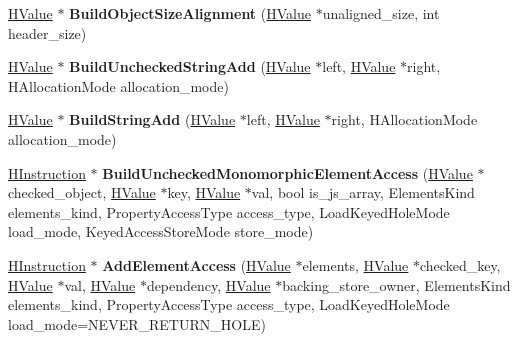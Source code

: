 \begin{DoxyCompactItemize}
\item 
\hyperlink{classv8_1_1internal_1_1_h_value}{H\+Value} $\ast$ {\bfseries Build\+Object\+Size\+Alignment} (\hyperlink{classv8_1_1internal_1_1_h_value}{H\+Value} $\ast$unaligned\+\_\+size, int header\+\_\+size)\hypertarget{classv8_1_1internal_1_1_h_graph_builder_af1a7dd376d381910a4a2dd7b678c6aa7}{}\label{classv8_1_1internal_1_1_h_graph_builder_af1a7dd376d381910a4a2dd7b678c6aa7}

\item 
\hyperlink{classv8_1_1internal_1_1_h_value}{H\+Value} $\ast$ {\bfseries Build\+Unchecked\+String\+Add} (\hyperlink{classv8_1_1internal_1_1_h_value}{H\+Value} $\ast$left, \hyperlink{classv8_1_1internal_1_1_h_value}{H\+Value} $\ast$right, H\+Allocation\+Mode allocation\+\_\+mode)\hypertarget{classv8_1_1internal_1_1_h_graph_builder_a9c72ba390fb67dd90f7692ae53a2450e}{}\label{classv8_1_1internal_1_1_h_graph_builder_a9c72ba390fb67dd90f7692ae53a2450e}

\item 
\hyperlink{classv8_1_1internal_1_1_h_value}{H\+Value} $\ast$ {\bfseries Build\+String\+Add} (\hyperlink{classv8_1_1internal_1_1_h_value}{H\+Value} $\ast$left, \hyperlink{classv8_1_1internal_1_1_h_value}{H\+Value} $\ast$right, H\+Allocation\+Mode allocation\+\_\+mode)\hypertarget{classv8_1_1internal_1_1_h_graph_builder_a26637e3f31db967d94388cf6a5f3299e}{}\label{classv8_1_1internal_1_1_h_graph_builder_a26637e3f31db967d94388cf6a5f3299e}

\item 
\hyperlink{classv8_1_1internal_1_1_h_instruction}{H\+Instruction} $\ast$ {\bfseries Build\+Unchecked\+Monomorphic\+Element\+Access} (\hyperlink{classv8_1_1internal_1_1_h_value}{H\+Value} $\ast$checked\+\_\+object, \hyperlink{classv8_1_1internal_1_1_h_value}{H\+Value} $\ast$key, \hyperlink{classv8_1_1internal_1_1_h_value}{H\+Value} $\ast$val, bool is\+\_\+js\+\_\+array, Elements\+Kind elements\+\_\+kind, Property\+Access\+Type access\+\_\+type, Load\+Keyed\+Hole\+Mode load\+\_\+mode, Keyed\+Access\+Store\+Mode store\+\_\+mode)\hypertarget{classv8_1_1internal_1_1_h_graph_builder_a31349bacb6b418d80b13464205bc1c77}{}\label{classv8_1_1internal_1_1_h_graph_builder_a31349bacb6b418d80b13464205bc1c77}

\item 
\hyperlink{classv8_1_1internal_1_1_h_instruction}{H\+Instruction} $\ast$ {\bfseries Add\+Element\+Access} (\hyperlink{classv8_1_1internal_1_1_h_value}{H\+Value} $\ast$elements, \hyperlink{classv8_1_1internal_1_1_h_value}{H\+Value} $\ast$checked\+\_\+key, \hyperlink{classv8_1_1internal_1_1_h_value}{H\+Value} $\ast$val, \hyperlink{classv8_1_1internal_1_1_h_value}{H\+Value} $\ast$dependency, \hyperlink{classv8_1_1internal_1_1_h_value}{H\+Value} $\ast$backing\+\_\+store\+\_\+owner, Elements\+Kind elements\+\_\+kind, Property\+Access\+Type access\+\_\+type, Load\+Keyed\+Hole\+Mode load\+\_\+mode=N\+E\+V\+E\+R\+\_\+\+R\+E\+T\+U\+R\+N\+\_\+\+H\+O\+LE)\hypertarget{classv8_1_1internal_1_1_h_graph_builder_ab95bcbb19b678432e62fbf5f0ce8db83}{}\label{classv8_1_1internal_1_1_h_graph_builder_ab95bcbb19b678432e62fbf5f0ce8db83}


\end{DoxyCompactItemize}
